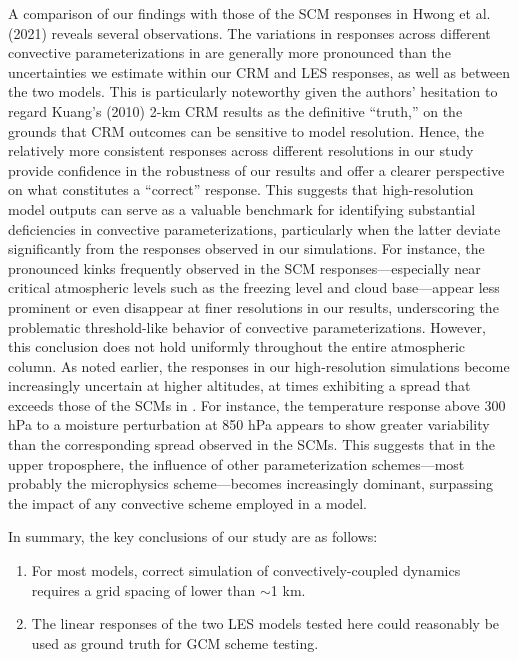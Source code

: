 \documentclass[draft]{agujournal2019}
\begin{document}
A comparison of our findings with those of the SCM responses in Hwong et al. (2021) reveals several observations. The variations in responses across different convective parameterizations in  are generally more pronounced than the uncertainties we estimate within our CRM and LES responses, as well as between the two models. This is particularly noteworthy given the authors’ hesitation to regard Kuang’s (2010) 2-km CRM results as the definitive “truth,” on the grounds that CRM outcomes can be sensitive to model resolution. Hence, the relatively more consistent responses across different resolutions in our study provide confidence in the robustness of our results and offer a clearer perspective on what constitutes a “correct” response. This suggests that high-resolution model outputs can serve as a valuable benchmark for identifying substantial deficiencies in convective parameterizations, particularly when the latter deviate significantly from the responses observed in our simulations. For instance, the pronounced kinks frequently observed in the SCM responses—especially near critical atmospheric levels such as the freezing level and cloud base—appear less prominent or even disappear at finer resolutions in our results, underscoring the problematic threshold-like behavior of convective parameterizations. However, this conclusion does not hold uniformly throughout the entire atmospheric column. As noted earlier, the responses in our high-resolution simulations become increasingly uncertain at higher altitudes, at times exhibiting a spread that exceeds those of the SCMs in . For instance, the temperature response above 300 hPa to a moisture perturbation at 850 hPa appears to show greater variability than the corresponding spread observed in the SCMs. This suggests that in the upper troposphere, the influence of other parameterization schemes—most probably the microphysics scheme—becomes increasingly dominant, surpassing the impact of any convective scheme employed in a model.


In summary, the key conclusions of our study are as follows:

\begin{enumerate}
    \item For most models, correct simulation of convectively-coupled dynamics
    requires a grid spacing of lower than $\sim$1 km.
    \item The linear responses of the two LES models tested here could
    reasonably be used as ground truth for GCM scheme testing.
\end{enumerate}
\end{document}
